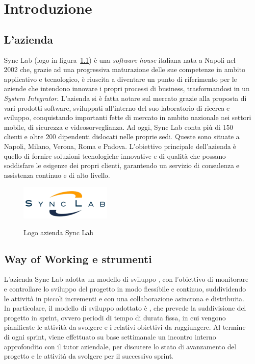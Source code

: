 \chapter{Introduzione}\label{cap:introduzione}

\section{L'azienda}

Sync Lab (logo in figura~\ref{fig:logo-synclab}) è una \textit{software house} italiana nata a Napoli nel 2002 che, grazie ad una progressiva
maturazione delle sue competenze in ambito applicativo e tecnologico, è riuscita a diventare un
punto di riferimento per le aziende che intendono innovare i propri processi di business,
trasformandosi in un \textit{System Integrator}. L'azienda si è fatta notare sul mercato grazie alla proposta
di vari prodotti software, sviluppati all'interno del suo laboratorio di ricerca e sviluppo, 
conquistando importanti fette di mercato in ambito nazionale nei settori mobile, di sicurezza e videosorveglianza.
Ad oggi, Sync Lab conta più di 150 clienti e oltre 200 dipendenti dislocati nelle proprie sedi.
Queste sono situate a Napoli, Milano, Verona, Roma e Padova.
L'obiettivo principale dell'azienda è quello di fornire soluzioni tecnologiche innovative e di qualità
che possano soddisfare le esigenze dei propri clienti, garantendo un servizio di consulenza
e assistenza continuo e di alto livello.\\

\begin{figure}[h]
    \centering
    \includegraphics[width=0.4\textwidth, alt={Logo dell'azienda Sync Lab}]{immagini/synclab.png}
    \caption{Logo azienda Sync Lab}\label{fig:logo-synclab}
\end{figure}

\newpage

\section{Way of Working e strumenti}
L'azienda Sync Lab adotta un modello di sviluppo , con l'obiettivo di monitorare e controllare lo sviluppo del progetto in modo flessibile e continuo, suddividendo le attività
in piccoli incrementi e con una collaborazione asincrona e distribuita. In particolare, il modello di sviluppo adottato è , che prevede la suddivisione del progetto in sprint,
ovvero periodi di tempo di durata fissa, in cui vengono pianificate le attività da svolgere e i relativi obiettivi da raggiungere. Al termine di ogni sprint, viene effettuato su base settimanale
un incontro interno approfondito con il tutor aziendale, per discutere lo stato di avanzamento del progetto e le attività da svolgere per il successivo sprint. \\

